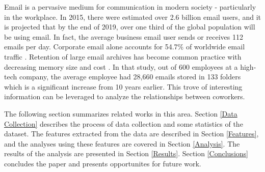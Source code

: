 \documentclass{article}
\begin{document}
Email is a pervasive medium for communication in modern society - particularly in the workplace.  In 2015, there were estimated over 2.6 billion email users, and it is projected that by the end of 2019, over one third of the global population will be using email.  In fact, the average business email user sends or receives 112 emails per day.  Corporate email alone accounts for 54.7\% of worldwide email traffic \cite{radicati_emails_2015}. Retention of large email archives has become common practice with decreasing memory size and cost \cite{fisher_revisiting_2006}.  In that study, out of 600 employees at a high-tech company, the average employee had 28,660 emails stored in 133 folders which is a significant increase from 10 years earlier.  This trove of interesting information can be leveraged to analyze the relationships between coworkers.
\par
The following section summarizes related works in this area.  Section \ref{Data Collection} describes the process of data collection and some statistics of the dataset.  The features extracted from the data are described in Section \ref{Features}, and the analyses using these features are covered in Section \ref{Analysis}.  The results of the analysis are presented in Section \ref{Results}.  Section \ref{Conclusions} concludes the paper and presents opportunites for future work.  
\end{document}
